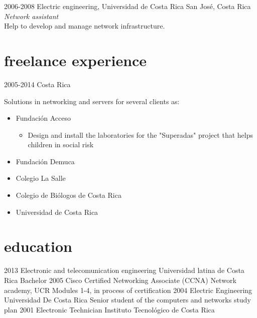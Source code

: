 \documentclass[]{friggeri-cv}
\begin{document}
\begin{entrylist}
\entry
{2006-2008}
{Electric engineering, Universidad de Costa Rica}
{San José, Costa Rica}
{\emph{Network assistant}\\
Help to develop and manage network infrastructure.
}
\end{entrylist}
\section{freelance experience}
\begin{entrylist}
\entry
{2005-2014}
{}
{Costa Rica}
{
Solutions in networking and servers for several clients as:
\begin{itemize}
\item Fundación Acceso
\begin{itemize}
\item Design and install the laboratories for the "Superadas" project that helps children in social risk
\end{itemize}
\item Fundación Demuca
\item Colegio La Salle
\item Colegio de Biólogos de Costa Rica
\item Universidad de Costa Rica
\end{itemize}
}
\end{entrylist}


\section{education}
\begin{entrylist}
	\entry
	{2013}
	{Electronic and telecomunication engineering}
	{Universidad latina de Costa Rica}
	{Bachelor}
	\entry
	{2005}
	{Cisco Certified Networking Associate (CCNA)}
	{Network academy, UCR}
	{Modules 1-4, in process of certification}
	\entry
	{2004}
	{Electric Engineering}
	{Universidad De Costa Rica}
	{Senior student of the computers and networks study plan}
	\entry
	{2001}
	{Electronic Technician}
	{Instituto Tecnológico de Costa Rica}
	{}
\end{entrylist}
\end{document}

